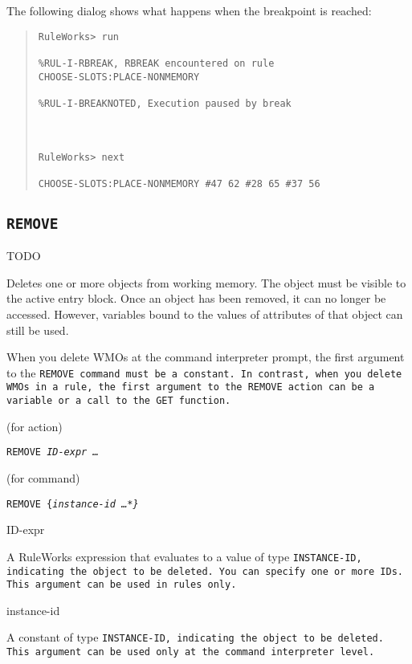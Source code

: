 {{The following dialog shows what happens when the breakpoint
is reached:
\begin{quote}
\begin{verbatim}
RuleWorks> run

%RUL-I-RBREAK, RBREAK encountered on rule
CHOOSE-SLOTS:PLACE-NONMEMORY

%RUL-I-BREAKNOTED, Execution paused by break



RuleWorks> next

CHOOSE-SLOTS:PLACE-NONMEMORY #47 62 #28 65 #37 56
\end{verbatim}
\end{quote}

\subsection{\tt{REMOVE}}
TODO

Deletes one or more objects from working memory. The object must be
visible to the active entry block. Once an object has been removed, it
can no longer be accessed. However, variables bound to the values of
attributes of that object can still be used.

\begin{note}
  When you delete WMOs at the command interpreter prompt, the first
  argument to the \tt{REMOVE} command must be a constant.  In contrast,
  when you delete WMOs in a rule, the first argument to the \tt{REMOVE}
  action can be a variable or a call to the \tt{GET} function.
\end{note}

\Format (for action)

\tt{REMOVE} \it{ID-expr} \ldots

\Format (for command)

\tt{REMOVE} \{\it{instance-id} \ldots \verb|*|\}

\begin{arguments}

\item[ID-expr]

  A RuleWorks expression that evaluates to a value of type
  \tt{INSTANCE-ID}, indicating the object to be deleted. You can
  specify one or more IDs. This argument can be used in rules only.

\item[instance-id]

  A constant of type \tt{INSTANCE-ID}, indicating the object to be
  deleted. This argument can be used only at the command interpreter
  level.


\end{arguments}}}
